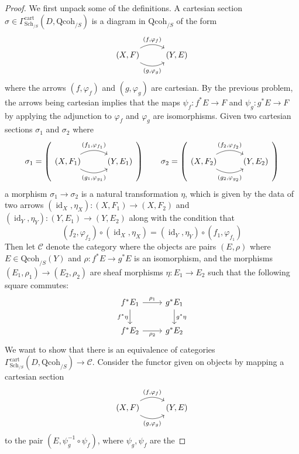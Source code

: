 \documentclass[psamsfonts, 12pt]{amsart}
\theoremstyle{definition}
\theoremstyle{remark}
\newcommand{\inv}{^{-1}}
\DeclareMathOperator{\id}{id}
\begin{document}
%
\begin{proof}
We first unpack some of the definitions. A cartesian section
$\sigma \in \Gamma^{\mathrm{cart}}_{\mathrm{Sch}_{/S}}(D,\mathrm{Qcoh}_{/S})$ is a
diagram in $\mathrm{Qcoh}_{/S}$ of the form
\[\begin{tikzcd}
(X,F) \ar[r, "{(f,\varphi_f)}", bend left=30] \ar[r, "{(g,\varphi_g)}"', bend right=30]
& (Y,E)
\end{tikzcd}\]
where the arrows $(f,\varphi_f)$ and $(g,\varphi_g)$ are cartesian. By the
previous problem, the arrows being cartesian implies that the maps $\psi_f : f^*E \to F$
and $\psi_g : g^*E \to F$ by applying the adjunction to $\varphi_f$ and $\varphi_g$
are isomorphisms. Given two cartesian sections $\sigma_1$ and $\sigma_2$ where
\[
\sigma_1 = \left(\begin{tikzcd}
(X,F_1) \ar[r, "{(f_1,\varphi_{f_1})}", bend left=30]
\ar[r, "{(g_1,\varphi_{g_1})}"', bend right=30]
& (Y,E_1)
\end{tikzcd}\right) \qquad
\sigma_2 = \left( \begin{tikzcd}
(X,F_2) \ar[r, "{(f_2,\varphi_{f_2})}", bend left=30]
\ar[r, "{(g_2,\varphi_{g_2})}"', bend right=30]
& (Y,E_2)
\end{tikzcd}\right)
\]
a morphism $\sigma_1 \to \sigma_2$ is a natural transformation $\eta$, which
is given by the data of two arrows $(\id_X, \eta_X) : (X,F_1) \to (X,F_2)$ and
$(\id_Y, \eta_Y) : (Y, E_1) \to (Y, E_2)$  along with the condition that
\[
(f_2,\varphi_{f_2}) \circ (\id_X,\eta_X) = (\id_Y,\eta_Y) \circ (f_1, \varphi_{f_1})
\]
Then let $\mathcal{C}$ denote the category where the objects are pairs
$(E, \rho)$ where $E \in \mathrm{Qcoh}_{/S}(Y)$ and $\rho : f^*E \to g^*E$ is
an isomorphism, and the morphisms $(E_1,\rho_1) \to (E_2,\rho_2)$ are
sheaf morphisms $\eta : E_1 \to E_2$ such that the following square commutes:
\[\begin{tikzcd}
f^*E_1 \ar[d, "f^*\eta"']\ar[r, "\rho_1"] & g^*E_1 \ar[d, "g^*\eta"] \\
f^*E_2 \ar[r, "\rho_2"'] & g^*E_2
\end{tikzcd}\]
We want to show that there is an equivalence of categories
$\Gamma^{\mathrm{cart}}_{\mathrm{Sch}_{/S}}(D, \mathrm{Qcoh}_{/S}) \to \mathcal{C}$.
Consider the functor given on objects by mapping a cartesian section
\[\begin{tikzcd}
(X,F) \ar[r, "{(f,\varphi_f)}", bend left=30] \ar[r, "{(g,\varphi_g)}"', bend right=30]
& (Y,E)
\end{tikzcd}\]
to the pair $(E, \psi_g\inv \circ \psi_f)$, where $\psi_g,\psi_f$ are the

\end{proof}
\end{document}
